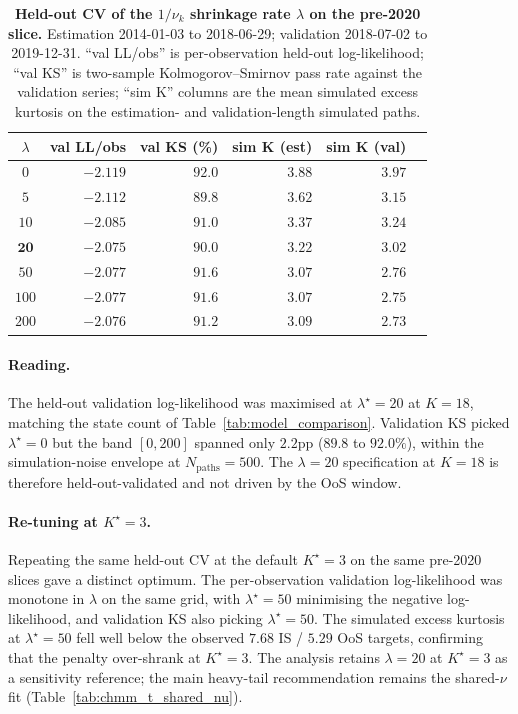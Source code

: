 \begin{table}[H]
\centering
\small
\caption{\textbf{Held-out CV of the $1/\nu_k$ shrinkage rate $\lambda$ on the pre-2020 slice.} Estimation 2014-01-03 to 2018-06-29; validation 2018-07-02 to 2019-12-31. ``val LL/obs'' is per-observation held-out log-likelihood; ``val KS'' is two-sample Kolmogorov--Smirnov pass rate against the validation series; ``sim K'' columns are the mean simulated excess kurtosis on the estimation- and validation-length simulated paths.}
\label{tab:lambda_cv_pre2020}
\begin{tabular}{c r r r r r}
\toprule
$\lambda$ & val LL/obs & val KS (\%) & sim K (est) & sim K (val) \\
\midrule
$0$    & $-2.119$ & $92.0$ & $3.88$ & $3.97$ \\
$5$    & $-2.112$ & $89.8$ & $3.62$ & $3.15$ \\
$10$   & $-2.085$ & $91.0$ & $3.37$ & $3.24$ \\
$\mathbf{20}$   & $\mathbf{-2.075}$ & $90.0$ & $3.22$ & $3.02$ \\
$50$   & $-2.077$ & $91.6$ & $3.07$ & $2.76$ \\
$100$  & $-2.077$ & $91.6$ & $3.07$ & $2.75$ \\
$200$  & $-2.076$ & $91.2$ & $3.09$ & $2.73$ \\
\bottomrule
\end{tabular}
\end{table}

\paragraph{Reading.}
The held-out validation log-likelihood was maximised at $\lambda^\star = 20$ at $K = 18$, matching the state count of Table~\ref{tab:model_comparison}. Validation KS picked $\lambda^\star = 0$ but the band $[0, 200]$ spanned only $2.2$pp ($89.8$ to $92.0\%$), within the simulation-noise envelope at $N_\text{paths} = 500$. The $\lambda = 20$ specification at $K = 18$ is therefore held-out-validated and not driven by the OoS window.

\paragraph{Re-tuning at $K^\star = 3$.}
Repeating the same held-out CV at the default $K^\star = 3$ on the same pre-2020 slices gave a distinct optimum. The per-observation validation log-likelihood was monotone in $\lambda$ on the same grid, with $\lambda^\star = 50$ minimising the negative log-likelihood, and validation KS also picking $\lambda^\star = 50$. The simulated excess kurtosis at $\lambda^\star = 50$ fell well below the observed $7.68$ IS / $5.29$ OoS targets, confirming that the penalty over-shrank at $K^\star = 3$. The analysis retains $\lambda = 20$ at $K^\star = 3$ as a sensitivity reference; the main heavy-tail recommendation remains the shared-$\nu$ fit (Table~\ref{tab:chmm_t_shared_nu}).

